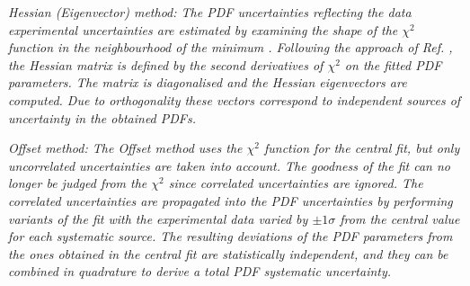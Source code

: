 \begin{description}
\item \it{Hessian (Eigenvector) method:} \rm
The PDF uncertainties reflecting the data experimental uncertainties are estimated by 
examining the shape of the $\chi^2$ function in the neighbourhood of the minimum \cite{Pumplin:2001ct}.
Following the approach of Ref. \cite{Pumplin:2001ct}, the Hessian matrix is defined by the second 
derivatives of $\chi^2$ on the fitted PDF parameters. The matrix is diagonalised and the 
Hessian eigenvectors are computed. 
Due to orthogonality these vectors correspond to independent sources of
uncertainty in the obtained PDFs.
\\
%

\item \it{Offset  method:} \rm
The Offset method \cite{Botje:2001fx} uses
%
the $\chi^2$ function for the central fit, but only
uncorrelated uncertainties are taken into account. 
The goodness of the fit can no longer be judged from the $\chi^2$ since correlated uncertainties are ignored. 
The correlated uncertainties are propagated into the PDF uncertainties by performing variants 
of the fit with the experimental data varied by $\pm 1 \sigma$ from the central value  
for each systematic source.
The resulting deviations of the PDF parameters from the ones obtained in the central 
fit are statistically independent, and they can be combined in quadrature to derive a total 
PDF systematic uncertainty.
%


\end{description}
